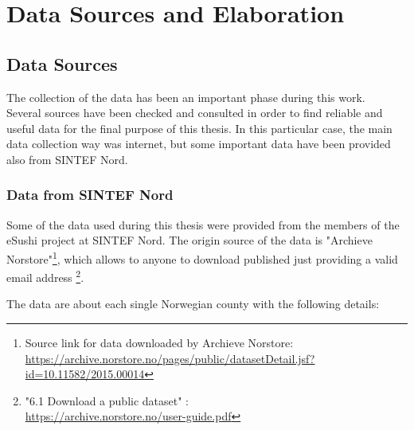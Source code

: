 
\newpage
\chapter{Data Sources and Elaboration}
\section{Data Sources}
The collection of the data has been an important phase during this work. \\
Several sources have been checked and consulted in order to find reliable and useful data for the final purpose of this thesis. In this particular case, the main data collection way was internet, but some important data have been provided also from SINTEF Nord.
\citation{}

\subsection{Data from SINTEF Nord}
Some of the data used during this thesis were provided from the members of the eSushi project at SINTEF Nord.
The origin source of the data is "Archieve Norstore"\footnote{Source link for data downloaded by Archieve Norstore: \\\url{https://archive.norstore.no/pages/public/datasetDetail.jsf?id=10.11582/2015.00014}}, which allows to anyone to download published just providing a valid email address \footnote{"6.1 Download a public dataset" : \\ \url{https://archive.norstore.no/user-guide.pdf}}. 

The data are about each single Norwegian county with the following details:\\

\begin{table}[ht]
    \caption{Data provided from SINTEF Nord. }
    \label{table: SINTEF_Data} 
\end{table}



